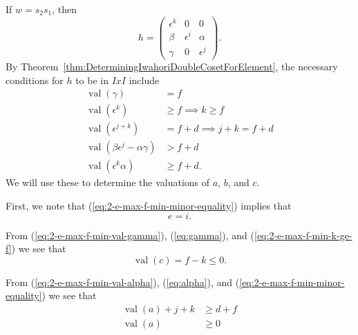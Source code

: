 \documentclass{amsart}
\theoremstyle{definition}
\def\e{\epsilon}
\def\val{\mathop{\mathrm{val}}}
\begin{document}
  If $w = s_2s_1$, then
  \begin{equation}
    h = \begin{pmatrix}
      \e^k & 0 & 0 \\
      \beta & \e^i & \alpha \\
      \gamma & 0 & \e^j
    \end{pmatrix}.
  \end{equation}
  By Theorem~\ref{thm:DeterminingIwahoriDoubleCosetForElement}, the necessary
  conditions for $h$ to be in $IxI$ include
  \begin{align}
    \label{eq:2-e-max-f-min-val-gamma}
    \val(\gamma) &= f \\
    \label{eq:2-e-max-f-min-k-ge-f}
    \val(\e^k) &\ge f \implies k \ge f \\
    \label{eq:2-e-max-f-min-minor-equality}
    \val(\e^{j+k}) &= f + d \implies j + k = f + d \\
    \label{eq:2-e-max-f-min-val-minor}
    \val(\beta\e^j - \alpha\gamma) &> f + d\\
    \label{eq:2-e-max-f-min-val-alpha}
    \val(\e^k\alpha) &\ge f + d.
  \end{align}
  We will use these to determine the valuations of $a$, $b$, and $c$.

  First, we note that (\ref{eq:2-e-max-f-min-minor-equality}) implies that
  \begin{equation}
    \label{eq:2-e-max-f-min-e-equals-i}
    e = i.
  \end{equation}
  
  From (\ref{eq:2-e-max-f-min-val-gamma}), (\ref{eq:gamma}), and
  (\ref{eq:2-e-max-f-min-k-ge-f})  we see
  that \begin{equation}
    \label{eq:2-e-max-f-min-val-c}
    \val(c) = f - k \le 0.
  \end{equation}

  From (\ref{eq:2-e-max-f-min-val-alpha}), (\ref{eq:alpha}), and
  (\ref{eq:2-e-max-f-min-minor-equality}) we see that
  \begin{align}
    \val(a) + j + k &\ge d + f \nonumber \\
    \label{eq:2-e-max-f-min-val-a}
    \val(a) &\ge 0
  \end{align}
\end{document}
